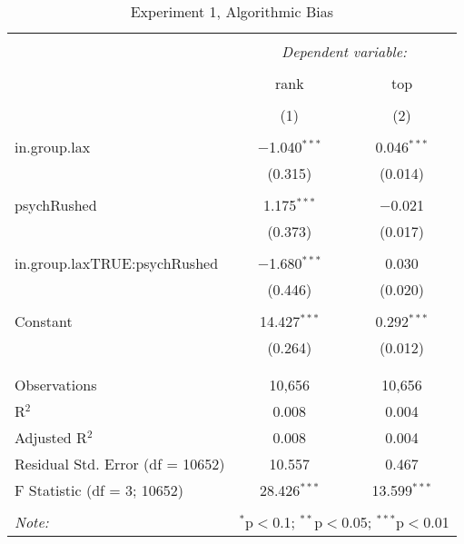 
\begin{table}[!htbp] \centering 
  \caption{Experiment 1, Algorithmic Bias} 
  \label{} 
\begin{tabular}{@{\extracolsep{5pt}}lcc} 
\\[-1.8ex]\hline 
\hline \\[-1.8ex] 
 & \multicolumn{2}{c}{\textit{Dependent variable:}} \\ 
\cline{2-3} 
\\[-1.8ex] & rank & top \\ 
\\[-1.8ex] & (1) & (2)\\ 
\hline \\[-1.8ex] 
 in.group.lax & $-$1.040$^{***}$ & 0.046$^{***}$ \\ 
  & (0.315) & (0.014) \\ 
  & & \\ 
 psychRushed & 1.175$^{***}$ & $-$0.021 \\ 
  & (0.373) & (0.017) \\ 
  & & \\ 
 in.group.laxTRUE:psychRushed & $-$1.680$^{***}$ & 0.030 \\ 
  & (0.446) & (0.020) \\ 
  & & \\ 
 Constant & 14.427$^{***}$ & 0.292$^{***}$ \\ 
  & (0.264) & (0.012) \\ 
  & & \\ 
\hline \\[-1.8ex] 
Observations & 10,656 & 10,656 \\ 
R$^{2}$ & 0.008 & 0.004 \\ 
Adjusted R$^{2}$ & 0.008 & 0.004 \\ 
Residual Std. Error (df = 10652) & 10.557 & 0.467 \\ 
F Statistic (df = 3; 10652) & 28.426$^{***}$ & 13.599$^{***}$ \\ 
\hline 
\hline \\[-1.8ex] 
\textit{Note:}  & \multicolumn{2}{r}{$^{*}$p$<$0.1; $^{**}$p$<$0.05; $^{***}$p$<$0.01} \\ 
\end{tabular} 
\end{table} 
